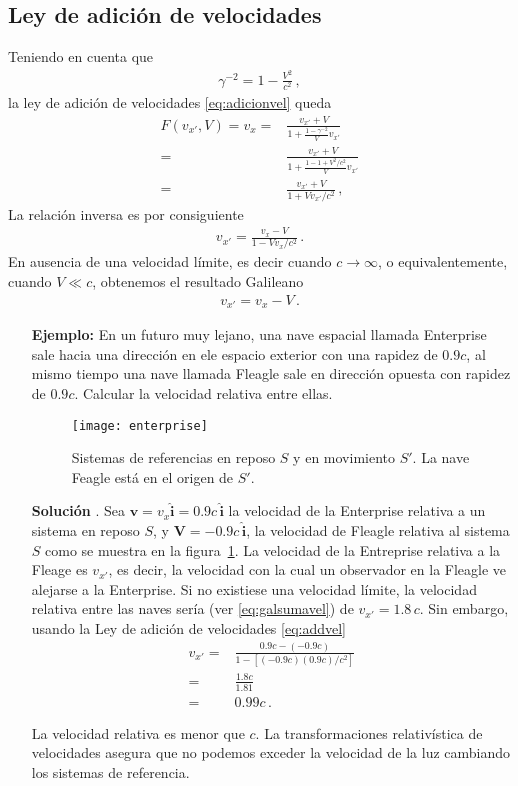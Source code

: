 \subsection{Ley de adición de velocidades}
Teniendo en cuenta que
\begin{align*}
  \gamma^{-2}=1-\frac{V^2}{c^2}\,,
\end{align*}
la ley de adición de velocidades \eqref{eq:adicionvel} queda
\begin{align*}
  F(v_{x'},V)=v_{x}=&\frac{v_{x'}+V}{1+\frac{1-\gamma^{-2}}{V}v_{x'}}\nonumber\\
  =&\frac{v_{x'}+V}{1+\frac{1-1+V^2/c^2}{V}v_{x'}}\nonumber\\
  =&\frac{v_{x'}+V}{1+{Vv_{x'}}/{c^2}}\,,
\end{align*}
La relación inversa es por consiguiente
\begin{align}
  \label{eq:addvel}
v_{x'}=\frac{v_x-V}{1-V v_x/c^2}\,.
\end{align}
En ausencia de una velocidad límite, es decir cuando $c\to \infty$, o equivalentemente, cuando $V\ll c$, obtenemos el resultado Galileano
\begin{align}
  \label{eq:galsumavel}
  v_{x'}=v_x-V\,.
\end{align}


\begin{itemize}
\item[\textbf{Ejemplo:}] En un futuro muy lejano, una nave espacial llamada Enterprise sale hacia una dirección en ele espacio exterior con una rapidez de $0.9c$, al mismo tiempo una nave llamada Fleagle sale en dirección opuesta con rapidez de $0.9c$. Calcular la velocidad relativa entre ellas.
  \begin{figure}
    \centering
    \texttt{[image: enterprise]}
    \caption{Sistemas de referencias en reposo $S$ y en movimiento $S'$. La nave Feagle está en el origen de $S'$.}
    \label{fig:enterprise}    
  \end{figure}
\item[\textbf{Solución}].  Sea $\mathbf{v}=v_x\hat{\mathbf{i}}=0.9c\,\hat{\mathbf{i}}$ la velocidad de la Enterprise relativa a un sistema en reposo $S$, y $\mathbf{V}=-0.9c\,\hat{\mathbf{i}}$, la velocidad de Fleagle relativa al sistema $S$ como se muestra en la figura~\ref{fig:enterprise}. La velocidad de la Entreprise relativa a la Fleage es $v_{x'}$, es decir, la velocidad con la cual un observador en la Fleagle ve alejarse a la Enterprise. Si no existiese una velocidad límite, la velocidad relativa entre las naves sería (ver \eqref{eq:galsumavel}) de $v_{x'}=1.8\,c$. Sin embargo, usando la Ley de adición de velocidades \eqref{eq:addvel}
  \begin{align*}
    v_{x'}=&\frac{0.9c-(-0.9c)}{1-[(-0.9c)(0.9c)/c^2]}\nonumber\\
    =&\frac{1.8c}{1.81}\nonumber\\
    =&0.99c\,.
  \end{align*}

La velocidad relativa es menor que $c$. La transformaciones relativística de velocidades asegura que no podemos exceder la velocidad de la luz cambiando los sistemas de referencia. 
\end{itemize}

